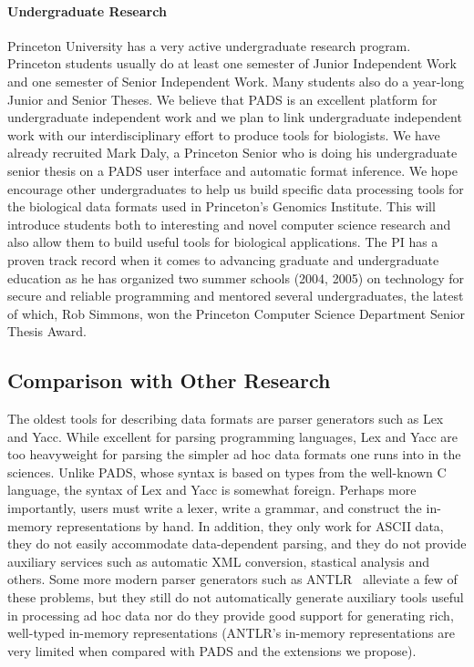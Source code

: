 \documentclass[11pt]{article}
\begin{document}
\paragraph*{Undergraduate Research}
Princeton University has a very active undergraduate research program.
Princeton students usually do at least one semester of
Junior Independent Work and one semester of Senior Independent Work. 
Many students also do a year-long
Junior and Senior Theses.  We believe that PADS is an excellent
platform for undergraduate independent work and we plan to link
undergraduate independent work with our interdisciplinary effort to
produce tools for biologists.  We have already recruited Mark Daly,
a Princeton Senior who is doing his undergraduate senior thesis
on a PADS user interface and automatic format inference.
We hope encourage other undergraduates to help us build
specific data processing tools for the biological data formats
used in Princeton's Genomics Institute.
This will introduce students both to interesting and novel
computer science research and also allow them to build useful
tools for biological applications. The PI has a proven track record
when it comes to advancing graduate and undergraduate education
as he has organized two summer schools (2004, 2005) on technology for
secure and reliable programming and mentored several undergraduates,
the latest of which, Rob Simmons, won the Princeton Computer Science Department
Senior Thesis Award.

\subsection{Comparison with Other Research}
\label{ssec:related}

The oldest tools for describing data formats are parser generators such as
Lex and Yacc.  While excellent for parsing programming languages, Lex and Yacc
are too heavyweight for parsing the simpler ad hoc data formats one
runs into in the sciences.   
Unlike PADS, whose syntax is based on types from the well-known C language,
the syntax of Lex and Yacc is somewhat foreign.  Perhaps more importantly,
users must write a lexer, write a
grammar, and construct the in-memory representations by hand.  In
addition, they only work for ASCII data, they do not easily
accommodate data-dependent parsing, and they do not provide auxiliary
services such as automatic XML conversion, stastical analysis and
others.  Some more modern parser generators such as ANTLR~\cite{antlr} alleviate
a few of these problems, but they still do not automatically generate auxiliary tools
useful in processing ad hoc data nor do they provide good support for generating
rich, well-typed in-memory representations (ANTLR's in-memory representations
are very limited when compared with PADS and the extensions we propose).
\end{document}
